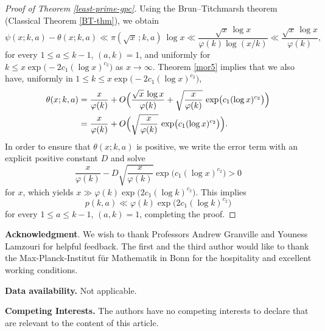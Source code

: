 \documentclass[pdflatex]{sn-jnl}%
\theoremstyle{sltheorems}
\theoremstyle{plainrem}
\theoremstyle{definition}
\begin{document}
\begin{proof}[Proof of Theorem \ref{least-prime-gpc}]
Using the Brun--Titchmarsh theorem (Classical Theorem \ref{BT-thm}), we obtain
$$
\psi(x;k,a) - \theta(x;k,a) \ll 
 \pi(\sqrt{x}\,; k , a)\ \log x
\ll
\frac{\sqrt{x}\, \log x}{\varphi(k) \log (x/k)}
\ll
\frac{\sqrt{x}\, \log x}{\varphi(k)},
$$
for every $1\le a \le k-1$, $(a,k)=1$, and
uniformly for
$k \le x \exp\bigl(- 2c_1 (\log x)^{c_2}\bigr)$ as $x\rightarrow \infty$.
%
Theorem \ref{mor5} implies that  we also have, uniformly in 
$ 1 \le k \le x \exp\bigl(- 2c_1 (\log x)^{c_2}\bigr)$,
\begin{align*}
    \theta(x;k,a) &= \frac{x}{\varphi(k)} 
    + O\Bigl( \frac{\sqrt{x} \,\log x}{\varphi(k)} +  \sqrt{\frac{x}{{\varphi(k)}}}\, \exp\bigl(c_1(\log x)^{c_2}\bigr) \Bigr) \\
   & = \frac{x}{\varphi(k)} + O \Bigl(  \sqrt{\frac{x}{\varphi(k)}}\, \exp\bigl(c_1(\log x)^{c_2}\bigr) \Bigr). 
\end{align*}
In order to ensure that $\theta(x;k,a)$ is positive, we write the error term
with an explicit positive 
constant $D$ and solve
\[
\frac{x}{\varphi(k)} - D \sqrt{\frac{x}{\varphi(k)}}\exp\bigl(c_1(\log x)^{c_2}\bigr) > 0
\]
for $x$, which yields $x \gg \varphi(k) \exp\bigl(2c_1(\log k)^{c_2}\bigr)$.
This implies
\[
p(k,a)  \ll \varphi(k) \exp\bigl(2c_1(\log k)^{c_2}\bigr)
\]
for every $1\le a \le k-1$, $(a,k)=1$, completing the proof.
\end{proof}


\medskip
\noindent \textbf{Acknowledgment}. 
We wish to thank 
Professors Andrew Granville and Youness Lamzouri for helpful feedback.
The first and the third author would like to thank the Max-Planck-Institut f\"ur Mathematik in Bonn 
for the hospitality and excellent working conditions.

\medskip
\noindent \textbf{Data availability.} Not applicable.


\medskip
\noindent \textbf{Competing Interests.} The authors have no competing interests to declare that are relevant to the content of this article.
\end{document}
